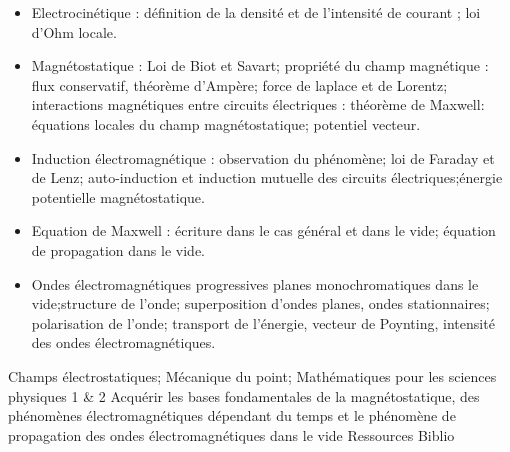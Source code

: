 \documentclass[10pt, a5paper]{report}
\begin{document}
{
\begin{itemize}
\item Electrocinétique : définition de la densité et de l'intensité de courant ; loi d'Ohm locale.
\item Magnétostatique : Loi de Biot et Savart; propriété du champ magnétique : flux conservatif, théorème d'Ampère; force de laplace et de Lorentz; interactions magnétiques entre circuits électriques : théorème de Maxwell: équations locales du champ magnétostatique; potentiel vecteur.
\item Induction électromagnétique : observation du phénomène; loi de Faraday et de Lenz; auto-induction et induction mutuelle des circuits électriques;énergie potentielle magnétostatique.
\item Equation de Maxwell : écriture dans le cas général et dans le vide; équation de propagation dans le vide.
\item Ondes électromagnétiques progressives planes monochromatiques dans le vide;structure de l'onde; superposition d'ondes planes, ondes stationnaires; polarisation de l'onde; transport de l'énergie, vecteur de Poynting, intensité des ondes électromagnétiques.
\end{itemize}
}
{Champs électrostatiques; Mécanique du point; Mathématiques pour les sciences physiques 1 \& 2}
{Acquérir les bases fondamentales de la magnétostatique, des phénomènes électromagnétiques dépendant du temps et le phénomène de propagation des ondes électromagnétiques dans le vide}
{Ressources} 
{Biblio} 
 
\vfill

\end{document}
